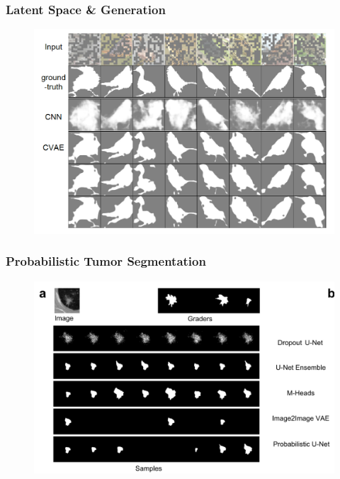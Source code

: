 \documentclass[10pt,mathserif]{beamer}
\begin{document}
\begin{frame}
  \frametitle{Latent Space \& Generation}
\begin{figure}[ht]
  \centering
  \includegraphics[width=0.6\paperwidth]{figure/vae_conditional}
  \caption{\label{fig:vae_conditional} }
\end{figure}
\end{frame}

\begin{frame}
  \frametitle{Probabilistic Tumor Segmentation}
\begin{figure}[ht]
  \centering
  \includegraphics[width=0.6\paperwidth]{figure/vae_unet}
  \caption{\label{fig:vae_unet} }
\end{figure}
\end{frame}
\end{document}
